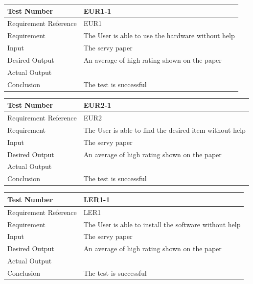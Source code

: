 \documentclass[12pt, titlepage]{article}
\begin{document}
\begin{table}[H]
\begin{center}
\begin{tabular}{|l | m{9cm}|}
\hline
  Test Number & EUR1-1\\
  \hline
  Requirement Reference & EUR1\\
  \hline
  Requirement & The User is able to use the hardware without help\\
  \hline
  Input & The servy paper\\
  \hline
  Desired Output & An average of high rating shown on the paper\\
  \hline
  Actual Output &\\
  \hline
  Conclusion & The test is successful\\
  \hline
\end{tabular}
\end{center}           
\end{table}

\begin{table}[H]
\begin{center}
\begin{tabular}{|l | m{9cm}|}
\hline
  Test Number & EUR2-1\\
  \hline
  Requirement Reference & EUR2\\
  \hline
  Requirement & The User is able to find the desired item without help\\
  \hline
  Input & The servy paper\\
  \hline
  Desired Output & An average of high rating shown on the paper\\
  \hline
  Actual Output &\\
  \hline
  Conclusion & The test is successful\\
  \hline
\end{tabular}
\end{center}           
\end{table}

\begin{table}[H]
\begin{center}
\begin{tabular}{|l | m{9cm}|}
\hline
  Test Number & LER1-1\\
  \hline
  Requirement Reference & LER1\\
  \hline
  Requirement & The User is able to install the software without help\\
  \hline
  Input & The servy paper\\
  \hline
  Desired Output & An average of high rating shown on the paper\\
  \hline
  Actual Output &\\
  \hline
  Conclusion & The test is successful\\
  \hline
\end{tabular}
\end{center}           
\end{table}
\end{document}

